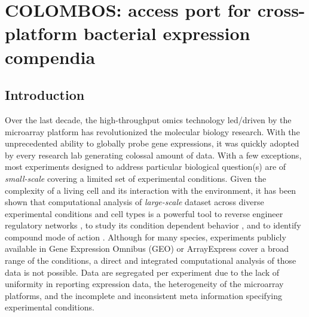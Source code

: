 \chapter{COLOMBOS: access port for cross-platform bacterial expression compendia}\label{ch:colombos}


\instructionsintroduction

\section{Introduction}

Over the last decade, the high-throughput omics technology led/driven by the  microarray platform has revolutionized the molecular biology research.  With the unprecedented ability to globally probe gene expressions, it was  quickly adopted by every research lab generating colossal amount of data.  With a few exceptions, most experiments designed to address particular  biological question(s) are of \textit{small-scale} covering a limited set of  experimental conditions. Given the complexity of a living cell and its interaction with the  environment, it has been shown that computational analysis of  \textit{large-scale} dataset across diverse experimental conditions and cell  types is a powerful tool to reverse engineer regulatory networks  \cite{Faith2007, Basso2005, Ernst2008}, to study its condition dependent  behavior \cite{Lemmens2009, Fadda2009}, and to identify compound mode of  action  \cite{Gardner2003, Basso2005, DiBernardo2005}. Although for many species, experiments publicly available in Gene Expression  Omnibus (GEO) \cite{Barrett2011} or ArrayExpress \cite{Parkinson2009} cover  a broad range of the conditions, a direct and integrated computational analysis  of those data is not possible. Data are segregated per experiment due to the lack of uniformity in  reporting expression data, the heterogeneity of the microarray platforms,  and the incomplete and inconsistent meta information specifying experimental  conditions.

